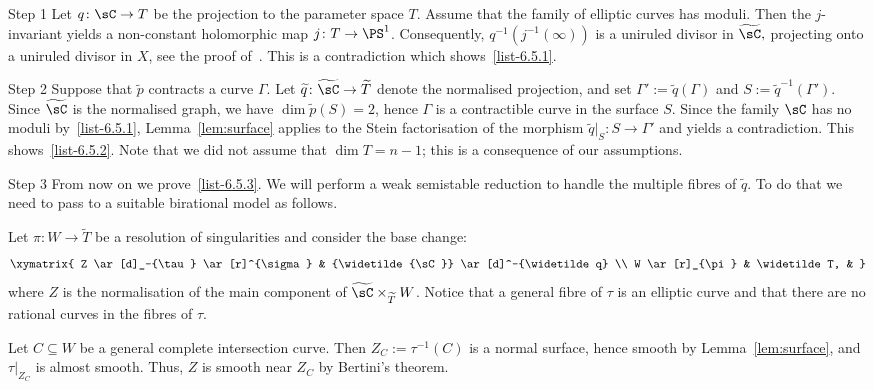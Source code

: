 \begin{proofc}
\begin{step}{Step 1}
Let $q\colon \sC \to T$ be the projection to the parameter space $T$. Assume that the family of elliptic curves has moduli. Then the $j$-invariant yields a non-constant holomorphic map $j\colon T \to \PS^1$. Consequently, $q^{-1} (j^{-1}(\infty))$ is a uniruled divisor in $ \widetilde {\sC},$ projecting onto a uniruled divisor in $X$, see the proof of~\cite[Corollary~3.34]{Voi03}. This is a contradiction which shows~\eqref{list-6.5.1}.
\end{step}

\begin{step}{Step 2}
Suppose that $\widetilde p$ contracts a curve $\Gamma$. Let $\widetilde q\colon \widetilde { \sC} \to \widetilde T $ denote the normalised projection, and set $\Gamma' := \widetilde q(\Gamma)$ and $S:=\widetilde q^{-1}(\Gamma')$. Since $\widetilde {\sC}$ is the normalised graph, we have $\dim \widetilde p(S) = 2$, hence $\Gamma$ is a contractible curve in the surface $S$. Since the family $\sC$ has no moduli by~\eqref{list-6.5.1}, Lemma~\ref{lem:surface} applies to the Stein factorisation of the morphism $\widetilde{q}|_S\colon S\to \Gamma'$ and yields a contradiction. This shows~\eqref{list-6.5.2}. Note that we did not assume that $\dim T = n-1$; this is a consequence of our assumptions.
\end{step}

\begin{step}{Step 3}
From now on we prove~\eqref{list-6.5.3}. We will perform a weak semistable reduction to handle the multiple fibres of $\widetilde q$. To do that we need to pass to a suitable birational model as follows.

Let $\pi\colon W\to \widetilde T$ be a resolution of singularities and consider the base change:
\[
\xymatrix{ Z \ar[d]_-{\tau} \ar[r]^{\sigma} & {\widetilde {\sC}} \ar[d]^-{\widetilde q} \\
W \ar[r]_{\pi} & \widetilde T, & }
\]
where $Z$ is the normalisation of the main component of $ \widetilde {\sC} \times_{\widetilde T} W$. Notice that a general fibre of $\tau$ is an elliptic curve and that there are no rational curves in the fibres of $\tau$.

Let $C \subseteq W$ be a general complete intersection curve. Then $Z_C := \tau^{-1}(C) $ is a normal surface, hence smooth by Lemma~\ref{lem:surface}, and $\tau|_{Z_C}$ is almost smooth. Thus, $Z$ is smooth near $Z_C$ by Bertini's theorem.


\end{step}
\end{proofc}
